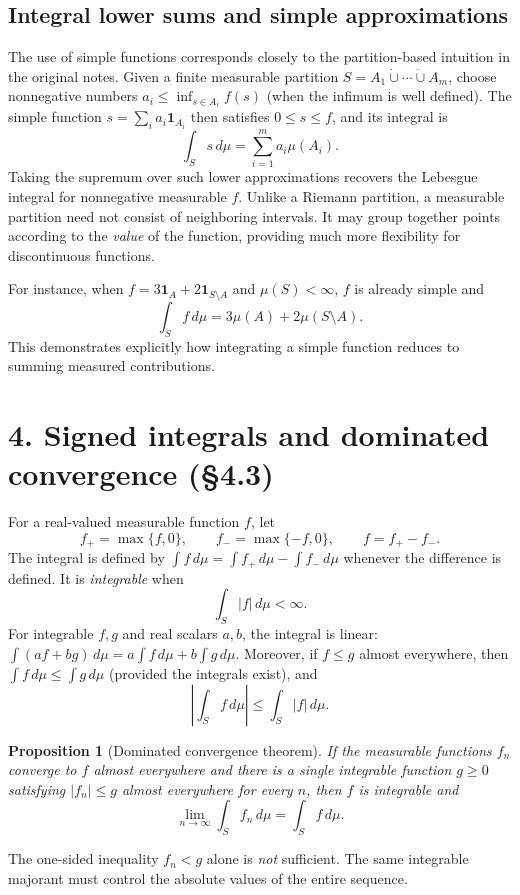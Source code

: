 \documentclass[10pt,a4paper]{article}
\newtheorem{proposition}{Proposition}
\begin{document}
\subsection*{Integral lower sums and simple approximations}
The use of simple functions corresponds closely to the partition-based intuition in the original notes. Given a finite measurable partition $S=A_1\mathbin{\dot\cup}\cdots\mathbin{\dot\cup}A_m$, choose nonnegative numbers $a_i\le \inf_{s\in A_i}f(s)$ (when the infimum is well defined). The simple function $s=\sum_i a_i\mathbf1_{A_i}$ then satisfies $0\le s\le f$, and its integral is
\[
\int_S s\,d\mu=\sum_{i=1}^{m}a_i\mu(A_i).
\]
Taking the supremum over such lower approximations recovers the Lebesgue integral for nonnegative measurable $f$. Unlike a Riemann partition, a measurable partition need not consist of neighboring intervals. It may group together points according to the \emph{value} of the function, providing much more flexibility for discontinuous functions.

For instance, when $f=3\mathbf1_A+2\mathbf1_{S\setminus A}$ and $\mu(S)<\infty$, $f$ is already simple and
\[
\int_S f\,d\mu=3\mu(A)+2\mu(S\setminus A).
\]
This demonstrates explicitly how integrating a simple function reduces to summing measured contributions.

\section*{4. Signed integrals and dominated convergence (\S4.3)}
For a real-valued measurable function $f$, let
\[
f_+=\max\{f,0\},\qquad f_-=\max\{-f,0\},\qquad f=f_+-f_-.
\]
The integral is defined by $\int f\,d\mu=\int f_+\,d\mu-\int f_-\,d\mu$ whenever the difference is defined. It is \emph{integrable} when
\[
\int_S|f|\,d\mu<\infty.
\]
For integrable $f,g$ and real scalars $a,b$, the integral is linear:
$\int(af+bg)\,d\mu=a\int f\,d\mu+b\int g\,d\mu$.
Moreover, if $f\le g$ almost everywhere, then $\int f\,d\mu\le\int g\,d\mu$ (provided the integrals exist), and
\[
\left|\int_S f\,d\mu\right|\le\int_S|f|\,d\mu.
\]

\begin{proposition}[Dominated convergence theorem]
If the measurable functions $f_n$ converge to $f$ almost everywhere and there is a \emph{single integrable} function $g\ge0$ satisfying $|f_n|\le g$ almost everywhere for every $n$, then $f$ is integrable and
\[
\lim_{n\to\infty}\int_S f_n\,d\mu=\int_S f\,d\mu.
\]
\end{proposition}
The one-sided inequality $f_n<g$ alone is \emph{not} sufficient. The same integrable majorant must control the absolute values of the entire sequence.
\end{document}

